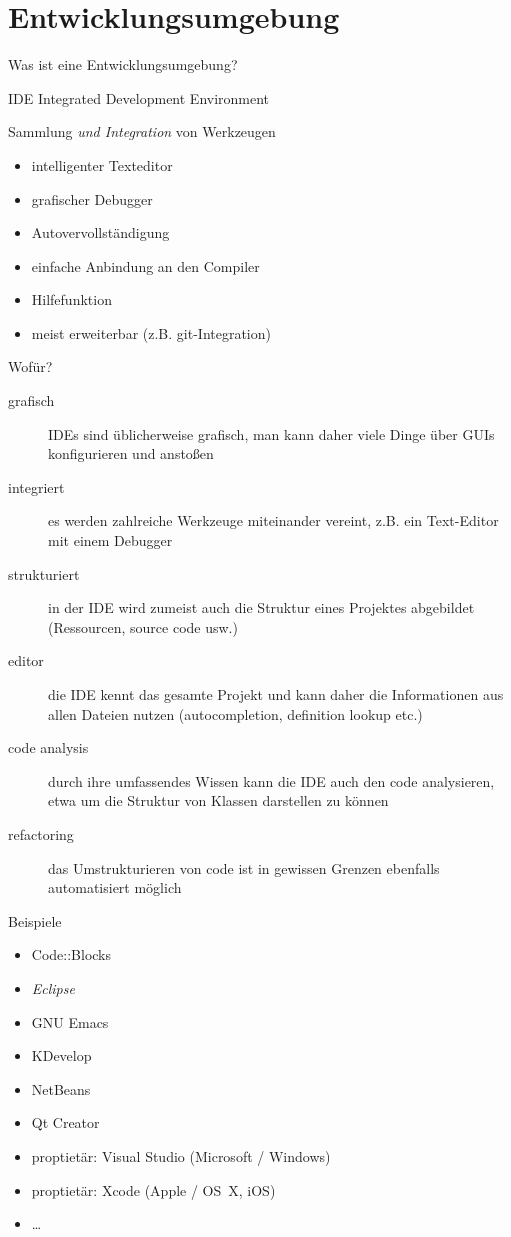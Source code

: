 \section{Entwicklungsumgebung}
\begin{frame}{Was ist eine Entwicklungsumgebung?}
	\begin{block}{IDE}
		Integrated Development Environment
	\end{block}
	\pause
	\begin{block}{Sammlung \emph{und Integration} von Werkzeugen}
		\begin{itemize}
			\item intelligenter Texteditor
			\item grafischer Debugger
			\item Autovervollständigung
			\item einfache Anbindung an den Compiler
			\item Hilfefunktion
			\item meist erweiterbar (z.B. git-Integration)
		\end{itemize}
	\end{block}
\end{frame}

\begin{frame}{Wofür?}
	\begin{description}
		\item[grafisch] IDEs sind üblicherweise grafisch, man kann daher viele Dinge über GUIs konfigurieren und anstoßen
		\item[integriert] es werden zahlreiche Werkzeuge miteinander vereint, z.B. ein Text-Editor mit einem Debugger
		\item[strukturiert] in der IDE wird zumeist auch die Struktur eines Projektes abgebildet (Ressourcen, source code usw.)
		\item[editor] die IDE kennt das gesamte Projekt und kann daher die Informationen aus allen Dateien nutzen (autocompletion, definition lookup etc.)
		\item[code analysis] durch ihre umfassendes Wissen kann die IDE auch den code analysieren, etwa um die Struktur von Klassen darstellen zu können
		\item[refactoring] das Umstrukturieren von code ist in gewissen Grenzen ebenfalls automatisiert möglich
	\end{description}
\end{frame}

\begin{frame}{Beispiele}
	\begin{itemize}
		\item Code::Blocks
		\item \emph{Eclipse}
		\item GNU Emacs
		\item KDevelop
		\item NetBeans
		\item Qt Creator
		\item proptietär: Visual Studio (Microsoft / Windows)
		\item proptietär: Xcode (Apple / OS~X, iOS)
		\item \dots
	\end{itemize}
\end{frame}